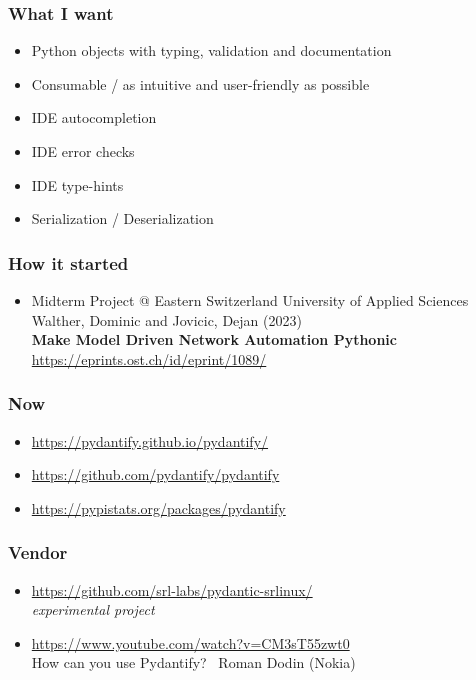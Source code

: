 \documentclass[aspectratio=169]{beamer}
\begin{document}
\begin{frame}
  \frametitle{What I want}
  \begin{itemize}
    \setlength\itemsep{1em}
    \item Python objects with typing, validation and documentation
    \item Consumable / as intuitive and user-friendly as possible
    \item IDE autocompletion
    \item IDE error checks
    \item IDE type-hints
    \item Serialization / Deserialization
  \end{itemize}
\end{frame}

\begin{frame}
  \frametitle{How it started}
  \begin{itemize}
    \setlength\itemsep{1em}
    \item Midterm Project @ Eastern Switzerland University of Applied Sciences\\ Walther, Dominic and Jovicic, Dejan (2023)\\ \textbf{Make Model Driven Network Automation Pythonic}\\\url{https://eprints.ost.ch/id/eprint/1089/}
  \end{itemize}
\end{frame}

\begin{frame}
  \frametitle{Now}
  \begin{itemize}
    \setlength\itemsep{1em}
    \item \url{https://pydantify.github.io/pydantify/}
    \item \url{https://github.com/pydantify/pydantify}
    \item \url{https://pypistats.org/packages/pydantify}
  \end{itemize}
\end{frame}

\begin{frame}
  \frametitle{Vendor}
  \begin{itemize}
    \setlength\itemsep{1em}
    \item \url{https://github.com/srl-labs/pydantic-srlinux/}\\\textit{experimental project}
    \item \url{https://www.youtube.com/watch?v=CM3sT55zwt0}\\How can you use Pydantify? \textemdash \ Roman Dodin (Nokia)
  \end{itemize}
\end{frame}
\end{document}
